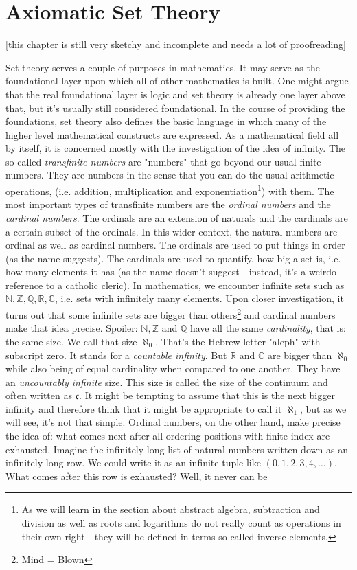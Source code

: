 \chapter{Axiomatic Set Theory}
[this chapter is still very sketchy and incomplete and needs a lot of proofreading]


Set theory serves a couple of purposes in mathematics. It may serve as the foundational layer upon which all of other mathematics is built. One might argue that the real foundational layer is logic and set theory is already one layer above that, but it's usually still considered foundational. In the course of providing the foundations, set theory also defines the basic language in which many of the higher level mathematical constructs are expressed. As a mathematical field all by itself, it is concerned mostly with the investigation of the idea of infinity. The so called \emph{transfinite numbers} are "numbers" that go beyond our usual finite numbers. They are numbers in the sense that you can do the usual arithmetic operations, (i.e. addition, multiplication and exponentiation\footnote{As we will learn in the section about abstract algebra, subtraction and division as well as roots and logarithms do not really count as operations in their own right - they will be defined in terms so called inverse elements.}) with them. The most important types of transfinite numbers are the \emph{ordinal numbers} and the \emph{cardinal numbers}. The ordinals are an extension of naturals and the cardinals are a certain subset of the ordinals. In this wider context, the natural numbers are ordinal as well as cardinal numbers. The ordinals are used to put things in order (as the name suggests). The cardinals are used to quantify, how big a set is, i.e. how many elements it has (as the name doesn't suggest - instead, it's a weirdo reference to a catholic cleric). In mathematics, we encounter infinite sets such as $\mathbb{N}, \mathbb{Z}, \mathbb{Q}, \mathbb{R}, \mathbb{C}$, i.e. sets with infinitely many elements. Upon closer investigation, it turns out that some infinite sets are bigger than others\footnote{Mind = Blown} and cardinal numbers make that idea precise. Spoiler: $\mathbb{N}, \mathbb{Z}$ and $\mathbb{Q}$ have all the same \emph{cardinality}, that is: the same size. We call that size $\aleph_0$. That's the Hebrew letter "aleph" with subscript zero. It stands for a \emph{countable infinity}. But $\mathbb{R}$ and $\mathbb{C}$ are bigger than $\aleph_0$ while also being of equal cardinality when compared to one another. They have an \emph{uncountably infinite} size. This size is called the size of the continuum and often written as $\mathfrak{c}$. It might be tempting to assume that this is the next bigger infinity and therefore think that it might be appropriate to call it $\aleph_1$, but as we will see, it's not that simple. Ordinal numbers, on the other hand, make precise the idea of: what comes next after all ordering positions with finite index are exhausted. Imagine the infinitely long list of natural numbers written down as an infinitely long row. We could write it as an infinite tuple like $(0,1,2,3,4,\ldots)$. What comes after this row is exhausted? Well, it never can be 